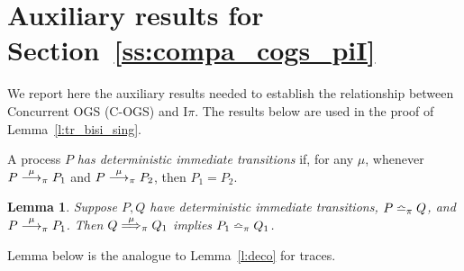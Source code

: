 \documentclass[11pt,a4paper]{amsart}
\theoremstyle{plain}
\theoremstyle{definition}
\theoremstyle{defC}
\theoremstyle{thmC}
\theoremstyle{plain}
\numberwithin{equation}{section}
\newcommand{\COGS}{\mbox{{\rm C-OGS}}\xspace}      %
\newcommand{\rmm}[1]{{\tt{\lowercase{#1}}}}
\newcommand{\genarr}[2]{\mathrel{\stackrel{{#1}}{\longrightarrow}_{\rmm{\lowercase{#2}}}}}
\newcommand{\genArr}[2]{\mathrel{\stackrel{{#1}}{\Longrightarrow}_{\rmm{\lowercase{#2}}}}}  %
\newcommand{\genlongrightarrow}[1]{\mathrel{\longrightarrow_{\rmm{\lowercase{#1}}}}}
\newcommand{\arrPI}[1]{\genarr{#1}{\pi}}   %
\newcommand{\ArrPI}[1]{\genArr{#1}{\pi}}   %
\newcommand{\longrightarrowPI}{\genlongrightarrow{\pi}}
\newcommand{\arrC}[1]{\genarr{#1}{C}}   %
\newcommand{\longrightarrowp}{\genlongrightarrow{C}}
\newcommand{\genTE}[1]{\mathrel{\bumpeq_{\rmm{\lowercase{#1}}}}}       %
\newcommand{\genwb}[1]{\mathrel{\approx_{\rmm{\lowercase{#1}}}}}       %
\newcommand{\wbPI}{\genwb{\pi}}       %
\newcommand{\TEPI}{\genTE{\pi}}       %
\newcommand{\contr}{\mathrel{\mbox{}_{\pi}\!\!\gtrsim}}
\newcommand{\FF}{F}
\newcommand{\PP}{P}
\newcommand{\QQ}{Q}
\newcommand{\encoEnvV}[1]{{\mathcal {O}} [\! [ #1 ] \! ]  } %
\newcommand{\encoConV}{\encoEnvV} %
\newcommand{\Intp}{\mbox{I$\pi$}\xspace}   %
\newcommand{\piI}{\Intp}   %
\newcommand{\act}{\mu}
\theoremstyle{plain}
\newtheorem{lemma}[thm]{Lemma}
\theoremstyle{definition}
\begin{document}
\section{Auxiliary results for Section~\ref{ss:compa_cogs_piI}}
\label{a:aux_tr_bisi_sing}

We report here the auxiliary results needed to establish the 
relationship between Concurrent OGS (\COGS) and \piI. 
%
%
%
%
%
%
%
%
%
%
%
%
%
%
%
The results below are used in the proof of Lemma~\ref{l:tr_bisi_sing}. 



A process $\PP$  \emph{has deterministic immediate transitions} if, for any $\act$, 
whenever $\PP \arrPI\act \PP_1 $ and   $\PP \arrPI\act \PP_2$, then $\PP_1 = \PP_2$. 

\begin{lemma}
\label{l:immediate_tr}
Suppose $\PP,\QQ$ have  deterministic immediate transitions, $\PP \TEPI \QQ$, 
 and $\PP \arrPI\act \PP_1$. Then 
$\QQ \ArrPI \act \QQ_1$ implies $\PP _1 \TEPI \QQ_1$. 
\end{lemma} 
\noindent
Lemma below is the analogue to  Lemma~\ref{l:deco} for traces.
\end{document}
